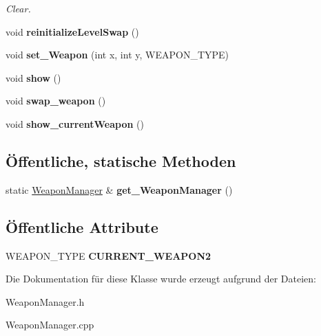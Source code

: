\begin{DoxyCompactItemize}
\begin{DoxyCompactList}\small\item\em Clear. \end{DoxyCompactList}\item 
\hypertarget{class_weapon_manager_a664a807d1f7599532affec338b3a868a}{void {\bfseries reinitialize\-Level\-Swap} ()}\label{class_weapon_manager_a664a807d1f7599532affec338b3a868a}

\item 
\hypertarget{class_weapon_manager_a6213a907c477df0f032ac4ebc8dd810d}{void {\bfseries set\-\_\-\-Weapon} (int x, int y, W\-E\-A\-P\-O\-N\-\_\-\-T\-Y\-P\-E)}\label{class_weapon_manager_a6213a907c477df0f032ac4ebc8dd810d}

\item 
\hypertarget{class_weapon_manager_ab9c945db9e377562d05493f9474ec499}{void {\bfseries show} ()}\label{class_weapon_manager_ab9c945db9e377562d05493f9474ec499}

\item 
\hypertarget{class_weapon_manager_ad2d37307f38fc2ae493d0ee804c9842f}{void {\bfseries swap\-\_\-weapon} ()}\label{class_weapon_manager_ad2d37307f38fc2ae493d0ee804c9842f}

\item 
\hypertarget{class_weapon_manager_a815b728b877f0f1fefceec97c1a6a7e9}{void {\bfseries show\-\_\-current\-Weapon} ()}\label{class_weapon_manager_a815b728b877f0f1fefceec97c1a6a7e9}

\end{DoxyCompactItemize}
\subsection*{Öffentliche, statische Methoden}
\begin{DoxyCompactItemize}
\item 
\hypertarget{class_weapon_manager_a43dc0489aed7aad37a65a0e6d687f06c}{static \hyperlink{class_weapon_manager}{Weapon\-Manager} \& {\bfseries get\-\_\-\-Weapon\-Manager} ()}\label{class_weapon_manager_a43dc0489aed7aad37a65a0e6d687f06c}

\end{DoxyCompactItemize}
\subsection*{Öffentliche Attribute}
\begin{DoxyCompactItemize}
\item 
\hypertarget{class_weapon_manager_a25afeaede894545ee2f7d7f9f1ce760d}{W\-E\-A\-P\-O\-N\-\_\-\-T\-Y\-P\-E {\bfseries C\-U\-R\-R\-E\-N\-T\-\_\-\-W\-E\-A\-P\-O\-N2}}\label{class_weapon_manager_a25afeaede894545ee2f7d7f9f1ce760d}

\end{DoxyCompactItemize}


Die Dokumentation für diese Klasse wurde erzeugt aufgrund der Dateien\-:\begin{DoxyCompactItemize}
\item 
Weapon\-Manager.\-h\item 
Weapon\-Manager.\-cpp\end{DoxyCompactItemize}
